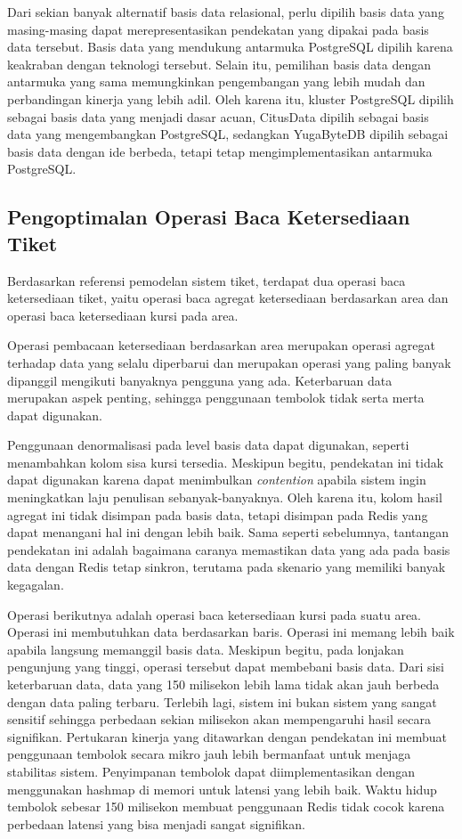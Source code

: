 Dari sekian banyak alternatif basis data relasional, perlu dipilih basis data yang masing-masing dapat merepresentasikan pendekatan yang dipakai pada basis data tersebut. Basis data yang mendukung antarmuka PostgreSQL dipilih karena keakraban dengan teknologi tersebut. Selain itu, pemilihan basis data dengan antarmuka yang sama memungkinkan pengembangan yang lebih mudah dan perbandingan kinerja yang lebih adil. Oleh karena itu, kluster PostgreSQL dipilih sebagai basis data yang menjadi dasar acuan, CitusData dipilih sebagai basis data yang mengembangkan PostgreSQL, sedangkan YugaByteDB dipilih sebagai basis data dengan ide berbeda, tetapi tetap mengimplementasikan antarmuka PostgreSQL.

\subsection{Pengoptimalan Operasi Baca Ketersediaan Tiket}

Berdasarkan referensi pemodelan sistem tiket, terdapat dua operasi baca ketersediaan tiket, yaitu operasi baca agregat ketersediaan berdasarkan area dan operasi baca ketersediaan kursi pada area.

Operasi pembacaan ketersediaan berdasarkan area merupakan operasi agregat terhadap data yang selalu diperbarui dan merupakan operasi yang paling banyak dipanggil mengikuti banyaknya pengguna yang ada. Keterbaruan data merupakan aspek penting, sehingga penggunaan tembolok tidak serta merta dapat digunakan.

Penggunaan denormalisasi pada level basis data dapat digunakan, seperti menambahkan kolom sisa kursi tersedia. Meskipun begitu, pendekatan ini tidak dapat digunakan karena dapat menimbulkan \textit{contention} apabila sistem ingin meningkatkan laju penulisan sebanyak-banyaknya. Oleh karena itu, kolom hasil agregat ini tidak disimpan pada basis data, tetapi disimpan pada Redis yang dapat menangani hal ini dengan lebih baik. Sama seperti sebelumnya, tantangan pendekatan ini adalah bagaimana caranya memastikan data yang ada pada basis data dengan Redis tetap sinkron, terutama pada skenario yang memiliki banyak kegagalan.

Operasi berikutnya adalah operasi baca ketersediaan kursi pada suatu area. Operasi ini membutuhkan data berdasarkan baris. Operasi ini memang lebih baik apabila langsung memanggil basis data. Meskipun begitu, pada lonjakan pengunjung yang tinggi, operasi tersebut dapat membebani basis data. Dari sisi keterbaruan data, data yang 150 milisekon lebih lama tidak akan jauh berbeda dengan data paling terbaru. Terlebih lagi, sistem ini bukan sistem yang sangat sensitif sehingga perbedaan sekian milisekon akan mempengaruhi hasil secara signifikan. Pertukaran kinerja yang ditawarkan dengan pendekatan ini membuat penggunaan tembolok secara mikro jauh lebih bermanfaat untuk menjaga stabilitas sistem. Penyimpanan tembolok dapat diimplementasikan dengan menggunakan hashmap di memori untuk latensi yang lebih baik. Waktu hidup tembolok sebesar 150 milisekon membuat penggunaan Redis tidak cocok karena perbedaan latensi yang bisa menjadi sangat signifikan.

